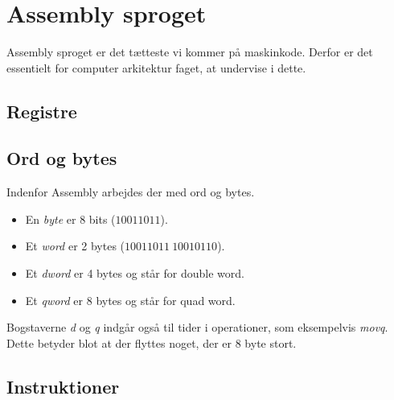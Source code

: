 \section{Assembly sproget}
Assembly sproget er det tætteste vi kommer på maskinkode.
Derfor er det essentielt for computer arkitektur faget, at undervise i dette.
\subsection{Registre}


\subsection{Ord og bytes}
Indenfor Assembly arbejdes der med ord og bytes.
\begin{itemize}
    \item En \textit{byte} er 8 bits ($10011011$).
    \item Et \textit{word} er 2 bytes ($10011011\:10010110$).
    \item Et \textit{dword} er 4 bytes og står for double word.
    \item Et \textit{qword} er 8 bytes og står for quad word.
\end{itemize}
Bogstaverne \textit{d} og \textit{q} indgår også til tider i operationer, som eksempelvis \textit{movq}.
Dette betyder blot at der flyttes noget, der er 8 byte stort.
\subsection{Instruktioner}